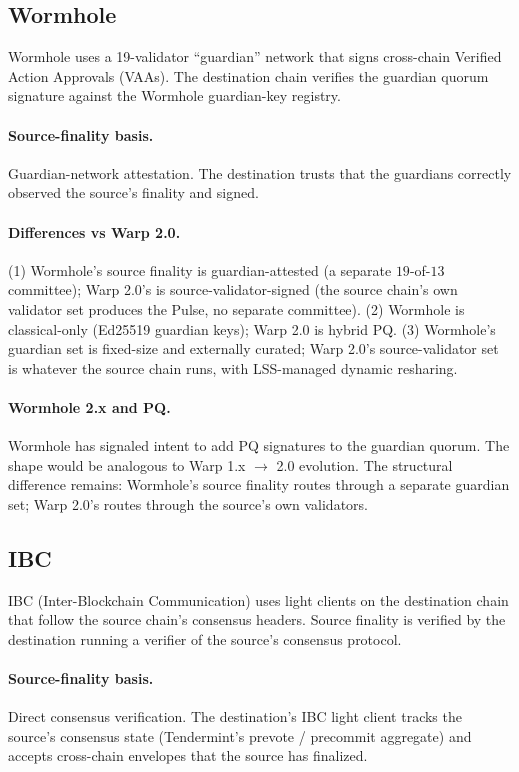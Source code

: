 \subsection{Wormhole}

Wormhole \cite{wormhole} uses a 19-validator ``guardian'' network that signs cross-chain Verified Action Approvals (VAAs). The destination chain verifies the guardian quorum signature against the Wormhole guardian-key registry.

\paragraph{Source-finality basis.} Guardian-network attestation. The destination trusts that the guardians correctly observed the source's finality and signed.

\paragraph{Differences vs Warp 2.0.} (1) Wormhole's source finality is guardian-attested (a separate $19$-of-$13$ committee); Warp 2.0's is source-validator-signed (the source chain's own validator set produces the Pulse, no separate committee). (2) Wormhole is classical-only (Ed25519 guardian keys); Warp 2.0 is hybrid PQ. (3) Wormhole's guardian set is fixed-size and externally curated; Warp 2.0's source-validator set is whatever the source chain runs, with LSS-managed dynamic resharing.

\paragraph{Wormhole 2.x and PQ.} Wormhole has signaled intent to add PQ signatures to the guardian quorum. The shape would be analogous to Warp 1.x $\to$ 2.0 evolution. The structural difference remains: Wormhole's source finality routes through a separate guardian set; Warp 2.0's routes through the source's own validators.

\subsection{IBC}

IBC \cite{ibc} (Inter-Blockchain Communication) uses light clients on the destination chain that follow the source chain's consensus headers. Source finality is verified by the destination running a verifier of the source's consensus protocol.

\paragraph{Source-finality basis.} Direct consensus verification. The destination's IBC light client tracks the source's consensus state (Tendermint's prevote / precommit aggregate) and accepts cross-chain envelopes that the source has finalized.

